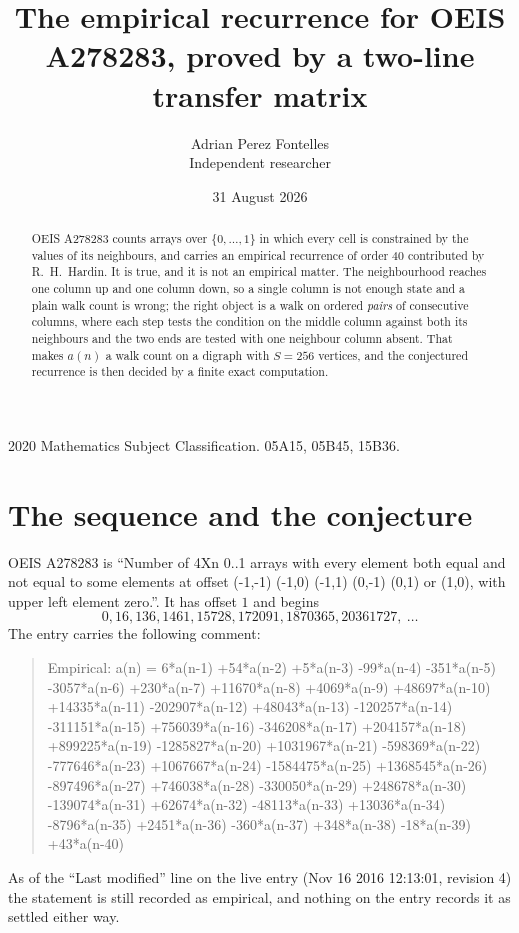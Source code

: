 \documentclass[11pt,a4paper]{article}
\title{The empirical recurrence for OEIS A278283, proved by a two-line transfer matrix}
\author{Adrian Perez Fontelles\\ \small Independent researcher}
\date{31 August 2026}
\theoremstyle{plain}
\theoremstyle{definition}
\begin{document}
\maketitle

\begin{abstract}
OEIS A278283 counts arrays over $\{0,\dots,1\}$ in which every cell is constrained by the
values of its neighbours, and carries an empirical recurrence of order $40$ contributed
by R.~H.~Hardin. It is true, and it is not an empirical matter. The neighbourhood reaches one
column up and one column down, so a single column is not enough state and a plain walk count
is wrong; the right object is a walk on ordered \emph{pairs} of consecutive columns, where
each step tests the condition on the middle column against both its neighbours and the two
ends are tested with one neighbour column absent. That makes $a(n)$ a walk count on a digraph
with $S=256$ vertices, and the conjectured recurrence is then decided by a finite exact
computation.
\end{abstract}

\noindent\small 2020 Mathematics Subject Classification. 05A15, 05B45, 15B36.\normalsize

\section{The sequence and the conjecture}

OEIS A278283 is ``Number of 4Xn 0..1 arrays with every element both equal and not equal to some elements at offset (-1,-1) (-1,0) (-1,1) (0,-1) (0,1) or (1,0), with upper left element zero.''. It has offset $1$ and begins
\[
0, 16, 136, 1461, 15728, 172091, 1870365, 20361727,\ \dots
\]
The entry carries the following comment:
\begin{quote}\small
Empirical: a(n) = 6*a(n-1) +54*a(n-2) +5*a(n-3) -99*a(n-4) -351*a(n-5) -3057*a(n-6) +230*a(n-7) +11670*a(n-8) +4069*a(n-9) +48697*a(n-10) +14335*a(n-11) -202907*a(n-12) +48043*a(n-13) -120257*a(n-14) -311151*a(n-15) +756039*a(n-16) -346208*a(n-17) +204157*a(n-18) +899225*a(n-19) -1285827*a(n-20) +1031967*a(n-21) -598369*a(n-22) -777646*a(n-23) +1067667*a(n-24) -1584475*a(n-25) +1368545*a(n-26) -897496*a(n-27) +746038*a(n-28) -330050*a(n-29) +248678*a(n-30) -139074*a(n-31) +62674*a(n-32) -48113*a(n-33) +13036*a(n-34) -8796*a(n-35) +2451*a(n-36) -360*a(n-37) +348*a(n-38) -18*a(n-39) +43*a(n-40)
\end{quote}
As of the ``Last modified'' line on the live entry (Nov 16 2016 12:13:01, revision 4) the statement is
still recorded as empirical, and nothing on the entry records it as settled either way.
\end{document}
